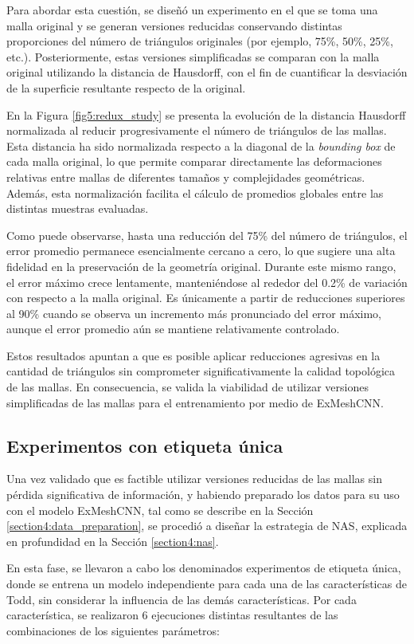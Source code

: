 Para abordar esta cuestión, se diseñó un experimento en el que se toma una malla original y se generan versiones reducidas conservando distintas proporciones del número de triángulos originales (por ejemplo, 75\%, 50\%, 25\%, etc.). Posteriormente, estas versiones simplificadas se comparan con la malla original utilizando la distancia de Hausdorff, con el fin de cuantificar la desviación de la superficie resultante respecto de la original.

En la Figura \ref{fig5:redux_study} se presenta la evolución de la distancia Hausdorff normalizada al reducir progresivamente el número de triángulos de las mallas. Esta distancia ha sido normalizada respecto a la diagonal de la \textit{bounding box} de cada malla original, lo que permite comparar directamente las deformaciones relativas entre mallas de diferentes tamaños y complejidades geométricas. Además, esta normalización facilita el cálculo de promedios globales entre las distintas muestras evaluadas.

Como puede observarse, hasta una reducción del 75\% del número de triángulos, el error promedio permanece esencialmente cercano a cero, lo que sugiere una alta fidelidad en la preservación de la geometría original. Durante este mismo rango, el error máximo crece lentamente, manteniéndose al rededor del 0.2\% de variación con respecto a la malla original. Es únicamente a partir de reducciones superiores al 90\% cuando se observa un incremento más pronunciado del error máximo, aunque el error promedio aún se mantiene relativamente controlado.

Estos resultados apuntan a que es posible aplicar reducciones agresivas en la cantidad de triángulos sin comprometer significativamente la calidad topológica de las mallas. En consecuencia, se valida la viabilidad de utilizar versiones simplificadas de las mallas para el entrenamiento por medio de ExMeshCNN.

\subsection{Experimentos con etiqueta única}
Una vez validado que es factible utilizar versiones reducidas de las mallas sin pérdida significativa de información, y habiendo preparado los datos para su uso con el modelo ExMeshCNN, tal como se describe en la Sección \ref{section4:data_preparation}, se procedió a diseñar la estrategia de NAS, explicada en profundidad en la Sección \ref{section4:nas}.

En esta fase, se llevaron a cabo los denominados experimentos de etiqueta única, donde se entrena un modelo independiente para cada una de las características de Todd, sin considerar la influencia de las demás características. Por cada característica, se realizaron 6 ejecuciones distintas resultantes de las combinaciones de los siguientes parámetros:


